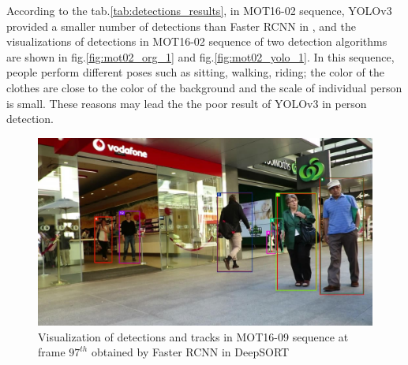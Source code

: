 According to the tab.\ref{tab:detections_results}, in MOT16-02 sequence, YOLOv3\cite{yolov3} provided a smaller number of detections than
Faster \acrshort{RCNN} in \cite{Wojke2017simple}, and the visualizations of detections in MOT16-02 sequence of two detection algorithms are shown in
fig.\ref{fig:mot02_org_1} and fig.\ref{fig:mot02_yolo_1}. In this sequence, people perform different poses such as
sitting, walking, riding; the color of the clothes are close to the color of the background and the scale of individual person is small.
These reasons may lead the the poor result of YOLOv3\cite{yolov3} in person detection.
\begin{figure}[h!]
    \centering
    \includegraphics[width=\textwidth]{Chapters/Fig/mot09_org_1.jpg}
    \caption{Visualization of detections and tracks in MOT16-09 sequence at frame $\text{97}^{th}$ obtained by Faster \acrshort{RCNN} in DeepSORT\cite{Wojke2017simple}}
    \label{fig:mot09_org_1}
\end{figure}

